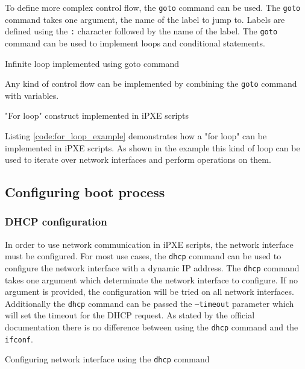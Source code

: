 \documentclass[../main.tex]{subfiles}
\begin{document}
To define more complex control flow, the \texttt{goto} command can be used.
The \texttt{goto} command takes one argument, the name of the label to jump to.
Labels are defined using the \texttt{:} character followed by the name of the label.
The \texttt{goto} command can be used to implement loops and conditional statements.

\begin{listing}[H]
  \caption{Infinite loop implemented using goto command}
\end{listing}

Any kind of control flow can be implemented by combining the \texttt{goto} command with variables.

\begin{listing}[H]
  \caption{"For loop" construct implemented in iPXE scripts}
  \label{code:for_loop_example}
\end{listing}

Listing \ref{code:for_loop_example} demonstrates how a "for loop" can be implemented in iPXE scripts. As shown in the example this kind of loop can be used to
iterate over network interfaces and perform operations on them.

\subsection{Configuring boot process}

\subsubsection{DHCP configuration}

In order to use network communication in iPXE scripts, the network interface must be configured.
For most use cases, the \texttt{dhcp} command can be used to configure the network interface with a dynamic IP address.
The \texttt{dhcp} command takes one argument which determinate the network interface to configure.
If no argument is provided, the configuration will be tried on all network interfaces.
Additionally the \texttt{dhcp} command can be passed the \texttt{--timeout} parameter which will set the timeout for the DHCP request.
As stated by the official documentation \cite{ipxe_dhcp_vs_ifconfig} there is no difference between using the \texttt{dhcp} command and the \texttt{ifconf}.

\begin{listing}[H]
  \caption{Configuring network interface using the \texttt{dhcp} command}
  \label{code:dhcp_configuration}
\end{listing}
\end{document}
